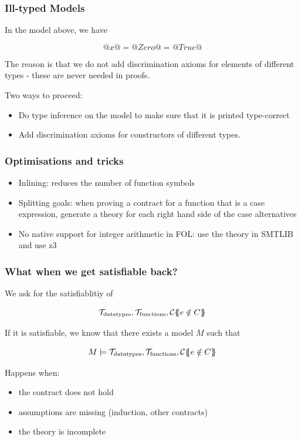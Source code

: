 \documentclass[serif,professionalfont]{beamer}
\begin{document}
\begin{frame}
  \frametitle{Ill-typed Models}
    In the model above, we have

    $$@x@ = @Zero@ = @True@$$

    The reason is that we do not add discrimination axioms for
    elements of different types - these are never needed in proofs.

    Two ways to proceed:

    \begin{itemize}

      \item Do type inference on the model to make sure that it is
        printed type-correct

      \item Add discrimination axioms for constructors of different
        types.

    \end{itemize}
\end{frame}

\begin{frame}[fragile]
  \frametitle{Optimisations and tricks}

    \begin{itemize}

      \item Inlining: reduces the number of function symbols

      \item Splitting goals: when proving a contract for a function
        that is a case expression, generate a theory for each right
        hand side of the case alternatives

      \item No native support for integer arithmetic in FOL: use
        the theory in SMTLIB and use z3
    \end{itemize}

\end{frame}

\begin{frame}[fragile]
  \frametitle{What when we get satisfiable back?}

  We ask for the satisfiablitiy of

  $$
    \mathcal{T}_{\text{datatypes}}, \mathcal{T}_{\text{functions}} ,
    {\cal C}\{\!\!\{e \notin C\}\!\!\}
  $$

  If it is satisfiable, we know that there exists a model $M$ such that

  $$
    M \models
    \mathcal{T}_{\text{datatypes}},
    \mathcal{T}_{\text{functions}} ,
    {\cal C}\{\!\!\{e \notin C\}\!\!\}
  $$

  Happens when:
    \begin{itemize}
      \item the contract does not hold

      \item assumptions are missing (induction, other contracts)

      \item the theory is incomplete
    \end{itemize}

\end{frame}
\end{document}
